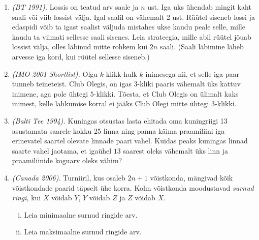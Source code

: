 \documentclass{article}
\begin{document}
\begin{enumerate}
		\item
		\emph{(BT 1991).} Lossis on teatud arv saale ja $n$ ust. Iga uks ühendab mingit kaht saali või viib lossist
		välja. Igal saalil on vähemalt 2 ust. Rüütel siseneb lossi ja edaspidi võib ta igast saalist
		väljuda mistahes ukse kaudu peale selle, mille kaudu ta viimati sellesse saali sisenes.
		Leia strateegia, mille abil rüütel jõuab lossist välja, olles läbinud mitte rohkem kui $2n$
		saali. (Saali läbimine läheb arvesse iga kord, kui rüütel sellesse siseneb.)

		\item
		\emph{(IMO 2001 Shortlist).} Olgu $k$-klikk hulk $k$ inimesega nii, et selle iga paar tunneb teineteist. Club Olegis, on igas $3$-kliki paaris vähemalt üks kattuv inimene, aga pole ühtegi $5$-klikki. Tõesta, et Club Olegis on ülimalt kaks inimest, kelle lahkumise korral ei jääks Club Olegi mitte ühtegi $3$-klikki.
		
		
		\item
		\emph{(Balti Tee 1994).} Kuningas otsustas lasta ehitada oma kuningriigi 13 asustamata
		saarele kokku 25 linna ning panna käima praamiliini iga erinevatel
		saartel olevate linnade paari vahel. Kuidas peaks kuningas linnad saarte
		vahel jaotama, et igaühel $13$ saarest oleks vähemalt üks linn ja praamiliinide
		koguarv oleks vähim?
		
		
		\item
		\emph{(Canada 2006).} Turniiril, kus osaleb $2n+1$ võistkonda, mängivad kõik võistkondade paarid täpselt ühe korra. Kolm võistkonda moodustavad \emph{surnud ringi}, kui $X$ võidab $Y$, $Y$ võidab $Z$ ja $Z$ võidab $X$.
		\begin{enumerate}[(i)]
			\item
			Leia minimaalne surnud ringide arv.
			\item
			Leia maksimaalne surnud ringide arv.
		\end{enumerate}
		
	\end{enumerate}	
\end{document}
